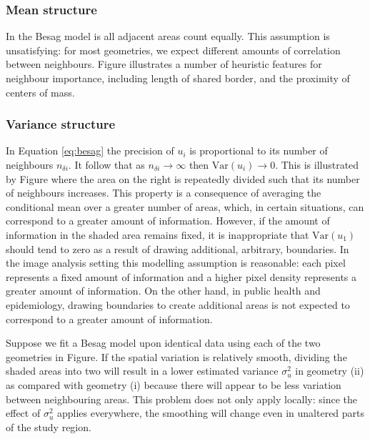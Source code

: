 \documentclass[a4paper, nobind]{templates/ociamthesis}
\begin{document}
\hypertarget{mean-structure}{%
\subsubsection{Mean structure}\label{mean-structure}}

In the Besag model is all adjacent areas count equally.
This assumption is unsatisfying: for most geometries, we expect different amounts of correlation between neighbours.
Figure illustrates a number of heuristic features for neighbour importance, including length of shared border, and the proximity of centers of mass.

\hypertarget{variance-structure}{%
\subsubsection{Variance structure}\label{variance-structure}}

In Equation \ref{eq:besag} the precision of \(u_i\) is proportional to its number of neighbours \(n_{\delta i}\).
It follow that as \(n_{\delta i} \to \infty\) then \(\text{Var}(u_i) \to 0\).
This is illustrated by Figure where the area on the right is repeatedly divided such that its number of neighbours increases.
This property is a consequence of averaging the conditional mean over a greater number of areas, which, in certain situations, can correspond to a greater amount of information.
However, if the amount of information in the shaded area remains fixed, it is inappropriate that \(\text{Var}(u_1)\) should tend to zero as a result of drawing additional, arbitrary, boundaries.
In the image analysis setting this modelling assumption is reasonable: each pixel represents a fixed amount of information and a higher pixel density represents a greater amount of information.
On the other hand, in public health and epidemiology, drawing boundaries to create additional areas is not expected to correspond to a greater amount of information.

Suppose we fit a Besag model upon identical data using each of the two geometries in Figure.
If the spatial variation is relatively smooth, dividing the shaded areas into two will result in a lower estimated variance \(\sigma^2_u\) in geometry (ii) as compared with geometry (i) because there will appear to be less variation between neighbouring areas.
This problem does not only apply locally: since the effect of \(\sigma^2_u\) applies everywhere, the smoothing will change even in unaltered parts of the study region.
\end{document}

